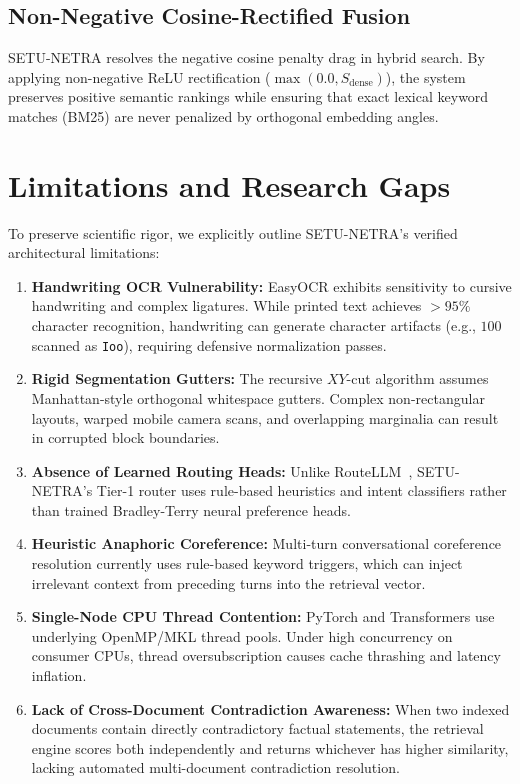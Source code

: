 \documentclass[11pt,a4paper]{article}
\begin{document}
\subsection{Non-Negative Cosine-Rectified Fusion}
SETU-NETRA resolves the negative cosine penalty drag in hybrid search. By applying non-negative ReLU rectification ($\max(0.0, S_{\text{dense}})$), the system preserves positive semantic rankings while ensuring that exact lexical keyword matches (BM25) are never penalized by orthogonal embedding angles.

\section{Limitations and Research Gaps}
\label{sec:limitations}

To preserve scientific rigor, we explicitly outline SETU-NETRA's verified architectural limitations:

\begin{enumerate}[label=\textbf{\arabic*.}]
    \item \textbf{Handwriting OCR Vulnerability:} EasyOCR exhibits sensitivity to cursive handwriting and complex ligatures. While printed text achieves $> 95\%$ character recognition, handwriting can generate character artifacts (e.g., $100$ scanned as \texttt{Ioo}), requiring defensive normalization passes.
    \item \textbf{Rigid Segmentation Gutters:} The recursive $XY$-cut algorithm assumes Manhattan-style orthogonal whitespace gutters. Complex non-rectangular layouts, warped mobile camera scans, and overlapping marginalia can result in corrupted block boundaries.
    \item \textbf{Absence of Learned Routing Heads:} Unlike RouteLLM~\cite{Ong2024RouteLLM}, SETU-NETRA's Tier-1 router uses rule-based heuristics and intent classifiers rather than trained Bradley-Terry neural preference heads.
    \item \textbf{Heuristic Anaphoric Coreference:} Multi-turn conversational coreference resolution currently uses rule-based keyword triggers, which can inject irrelevant context from preceding turns into the retrieval vector.
    \item \textbf{Single-Node CPU Thread Contention:} PyTorch and Transformers use underlying OpenMP/MKL thread pools. Under high concurrency on consumer CPUs, thread oversubscription causes cache thrashing and latency inflation.
    \item \textbf{Lack of Cross-Document Contradiction Awareness:} When two indexed documents contain directly contradictory factual statements, the retrieval engine scores both independently and returns whichever has higher similarity, lacking automated multi-document contradiction resolution.
\end{enumerate}
\end{document}
